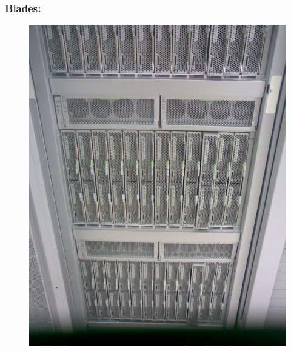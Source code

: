 \documentclass[10pt]{beamer}
\begin{document}
		\begin{frame}%
		\frametitle{Blades:}
			\begin{figure}
			\centering
				\includegraphics[scale=0.15]{./figuras/rack.jpg}
			\end{figure}
		\end{frame}
\end{document}
